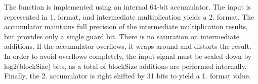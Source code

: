 \begin{DoxyParagraph}{}
The function is implemented using an internal 64-\/bit accumulator. The input is represented in 1. format, and intermediate multiplication yields a 2. format. The accumulator maintains full precision of the intermediate multiplication results, but provides only a single guard bit. There is no saturation on intermediate additions. If the accumulator overflows, it wraps around and distorts the result. In order to avoid overflows completely, the input signal must be scaled down by log2(block\-Size) bits, as a total of block\-Size additions are performed internally. Finally, the 2. accumulator is right shifted by 31 bits to yield a 1. format value. 
\end{DoxyParagraph}
